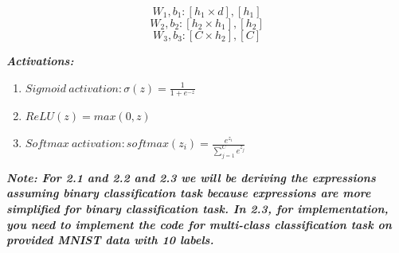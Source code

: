 \documentclass[letterpaper]{article}
\begin{document}
$$W_1, b_1: [h_1 \times d],[h_1]$$
$$W_2, b_2: [h_2 \times h_1], [h_2]$$
$$W_3, b_3: [C \times h_2],[C]$$

\textit{\textbf{Activations:}} 
\begin{enumerate}
    \item $ Sigmoid \ activation: \sigma(z) = \frac{1}{1 + e^{-z}}$
    \item $ReLU(z) = max(0,z)$
    \item $Softmax \ activation: softmax(z_i) = \frac{e^{z_i}}{\sum_{j=1}^{C}e^{z_j}}$
\end{enumerate}

\textit{\textbf{Note: For 2.1 and 2.2 and 2.3 we will be deriving the expressions assuming binary classification task because expressions are more simplified for binary classification task. In 2.3, for implementation, you need to implement the code for multi-class classification task on provided MNIST data with 10 labels. }}
\end{document}
